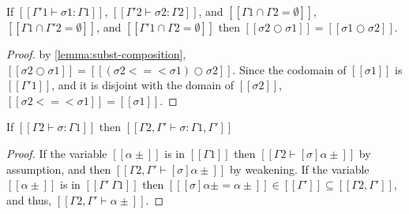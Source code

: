 \begin{corollary}
  \label{corollary:subst-composition-commutativity}
  If $[[Γ'1 ⊢ σ1 : Γ1]]$, $[[Γ'2 ⊢ σ2 : Γ2]]$, and
  $[[ {Γ1} ∩ {Γ2} = ∅ ]]$, 
  $[[ {Γ1} ∩ {Γ'2} = ∅ ]]$, and
  $[[ {Γ'1} ∩ {Γ2} = ∅ ]]$ then 
  $[[ σ2 ○ σ1 ]] = [[ σ1 ○ σ2 ]]$.
\end{corollary}
\begin{proof}
  by \cref{lemma:subst-composition},
    $[[ σ2 ○ σ1 ]] = [[ (σ2 <=< σ1) ○ σ2 ]]$.
    Since the codomain of $[[σ1]]$ is $[[Γ'1]]$,
    and it is disjoint with the domain of $[[σ2]]$,
    $[[σ2 <=< σ1]] = [[σ1]]$.
\end{proof}

\begin{lemma}
  \label{lemma:subst-domain-weakening}
  If $[[Γ2 ⊢ σ : Γ1]]$ then $[[Γ2, Γ' ⊢ σ : Γ1, Γ']]$
\end{lemma}
\begin{proof}
  If the variable $[[α±]]$ is in $[[Γ1]]$ then $[[Γ2 ⊢ [σ]α± ]]$ by assumption,
  and then $[[Γ2, Γ' ⊢ [σ]α± ]]$ by weakening.
  If the variable $[[α±]]$ is in $[[{Γ'} \ {Γ1}]]$ then $[[ [σ]α± = α± ]] \in [[Γ']] ⊆ [[Γ2, Γ']]$, 
  and thus, $[[Γ2, Γ' ⊢ α± ]]$.
\end{proof}

